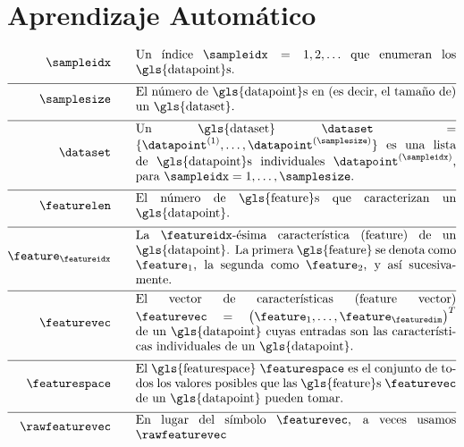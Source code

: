 \newpage
\section*{Aprendizaje Automático}

\begin{align}
	\sampleidx \quad\quad & \parbox{.75\textwidth}{Un índice $\sampleidx=1,2,\ldots$ que 
		enumeran los \gls{datapoint}s.}   \nonumber \\[2mm] \hline \nonumber\\[-5mm]
	\samplesize \quad\quad &\parbox{.75\textwidth}{El número de \gls{datapoint}s en (es decir, el tamaño de) un \gls{dataset}.} \nonumber \\[2mm] \hline \nonumber\\[-5mm] 
	\dataset \quad\quad & \parbox{.75\textwidth}{Un \gls{dataset} $\dataset = \{ \datapoint^{(1)},\ldots, \datapoint^{(\samplesize)} \}$ 
		es una lista de \gls{datapoint}s individuales $\datapoint^{(\sampleidx)}$, para $\sampleidx=1,\ldots,\samplesize$.}   \nonumber \\[2mm] \hline \nonumber\\[-5mm]
	\featurelen \quad\quad &\parbox{.75\textwidth}{El número de \gls{feature}s que caracterizan un \gls{datapoint}.}\nonumber \\[2mm] \hline \nonumber\\[-5mm]
	\feature_{\featureidx} \quad\quad &\parbox{.75\textwidth}{La $\featureidx$-ésima característica (feature) de un \gls{datapoint}. La primera \gls{feature} 
		se denota como $\feature_{1}$, la segunda como $\feature_{2}$, y así sucesivamente. } \nonumber \\[2mm] \hline \nonumber\\[-5mm] 
	\featurevec \quad\quad &\parbox{.75\textwidth}{El vector de características (feature vector) $\featurevec=\big(\feature_{1},\ldots,\feature_{\featuredim}\big)^{T}$ de un \gls{datapoint} 
		cuyas entradas son las características individuales de un \gls{datapoint}.}\nonumber \\[2mm] \hline \nonumber\\[-5mm]
	\featurespace \quad\quad & \parbox{.75\textwidth}{El \gls{featurespace} $\featurespace$ es 
		el conjunto de todos los valores posibles que las \gls{feature}s $\featurevec$ de un \gls{datapoint} pueden tomar.} \nonumber \\[2mm] \hline \nonumber\\[-5mm]
	\rawfeaturevec \quad\quad &\parbox{.75\textwidth}{En lugar del símbolo $\featurevec$, a veces usamos $\rawfeaturevec$ 
}
\end{align}
